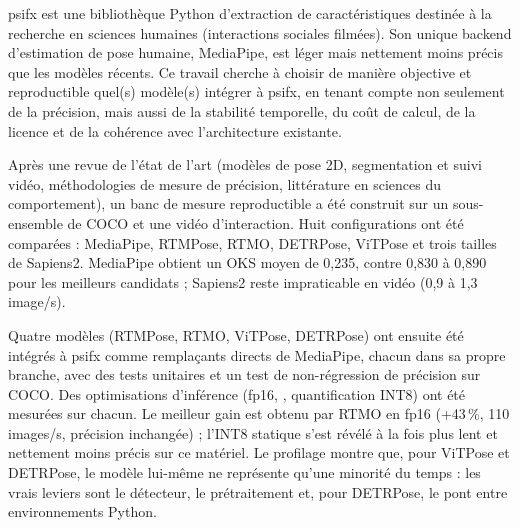 \documentclass[11pt,a4paper]{report}
\newcommand{\code}[1]{\texttt{\detokenize{#1}}}
\begin{document}
psifx \cite{psifx2024} est une bibliothèque Python d'extraction de caractéristiques destinée à la recherche en
sciences humaines (interactions sociales filmées). Son unique backend d'estimation de pose humaine, MediaPipe, est
léger mais nettement moins précis que les modèles récents. Ce travail cherche à choisir de manière objective et
reproductible quel(s) modèle(s) intégrer à psifx, en tenant compte non seulement de la précision, mais aussi de la
stabilité temporelle, du coût de calcul, de la licence et de la cohérence avec l'architecture existante.

Après une revue de l'état de l'art (modèles de pose 2D, segmentation et suivi vidéo, méthodologies de mesure de
précision, littérature en sciences du comportement), un banc de mesure reproductible a été construit sur un
sous-ensemble de COCO \cite{lin2014coco} et une vidéo d'interaction. Huit configurations ont été comparées :
MediaPipe, RTMPose, RTMO, DETRPose, ViTPose et trois tailles de Sapiens2. MediaPipe obtient un OKS moyen de 0,235,
contre 0,830 à 0,890 pour les meilleurs candidats ; Sapiens2 reste impraticable en vidéo (0,9 à 1,3 image/s).

Quatre modèles (RTMPose, RTMO, ViTPose, DETRPose) ont ensuite été intégrés à psifx comme remplaçants directs de
MediaPipe, chacun dans sa propre branche, avec des tests unitaires et un test de non-régression de précision sur
COCO. Des optimisations d'inférence (fp16, \code{torch.compile}, quantification INT8) ont été mesurées sur chacun.
Le meilleur gain est obtenu par RTMO en fp16 (+43\,\%, 110 images/s, précision inchangée) ; l'INT8 statique s'est
révélé à la fois plus lent et nettement moins précis sur ce matériel. Le profilage montre que, pour ViTPose et
DETRPose, le modèle lui-même ne représente qu'une minorité du temps : les vrais leviers sont le détecteur, le
prétraitement et, pour DETRPose, le pont entre environnements Python.
\end{document}
